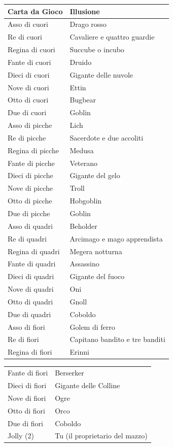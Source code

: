 \begin{multicols}{2}
\noindent\begin{tabularx}{0.48\textwidth}{ll}
	\toprule
\textbf{Carta da Gioco} & \textbf{Illusione} \\
\toprule
Asso di cuori & Drago rosso \\
Re di cuori & Cavaliere e quattro guardie \\
Regina di cuori & Succube o incubo \\
Fante di cuori & Druido \\
Dieci di cuori & Gigante delle nuvole \\
Nove di cuori & Ettin \\
Otto di cuori & Bugbear \\
Due di cuori & Goblin \\
Asso di picche & Lich \\
Re di picche & Sacerdote e due accoliti \\
Regina di picche & Medusa \\
Fante di picche & Veterano \\
Dieci di picche & Gigante del gelo \\
Nove di picche & Troll \\
Otto di picche & Hobgoblin \\
Due di picche & Goblin \\
Asso di quadri & Beholder \\
Re di quadri & Arcimago e mago apprendista \\
Regina di quadri & Megera notturna \\
Fante di quadri & Assassino \\
Dieci di quadri & Gigante del fuoco \\
Nove di quadri & Oni \\
Otto di quadri & Gnoll \\
Due di quadri & Coboldo \\
Asso di fiori & Golem di ferro \\
Re di fiori & Capitano bandito e tre banditi \\
Regina di fiori & Erinni \\
\end{tabularx}
\noindent\begin{tabularx}{0.48\textwidth}{ll}
Fante di fiori & Berserker \\
Dieci di fiori & Gigante delle Colline \\
Nove di fiori & Ogre \\
Otto di fiori & Orco \\
Due di fiori & Coboldo \\
Jolly (2) & Tu (il proprietario del mazzo) \\
\end{tabularx}


\end{multicols}
